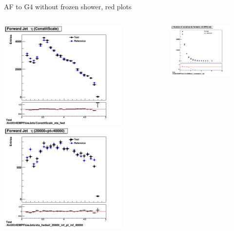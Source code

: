 \begin{frame}{AF to G4 without frozen shower, red plots}
    \begin{columns}
        \begin{column}{0.5\textwidth}
            \includegraphics[width=0.75\textwidth]{3r_eta_constit}
            \includegraphics[width=0.75\textwidth]{3r_eta_highpt}
        \end{column}
        \begin{column}{0.5\textwidth}
            \includegraphics[width=0.75\textwidth]{3r_numconstit_EM}

\end{column}
\end{columns}
\end{frame}
